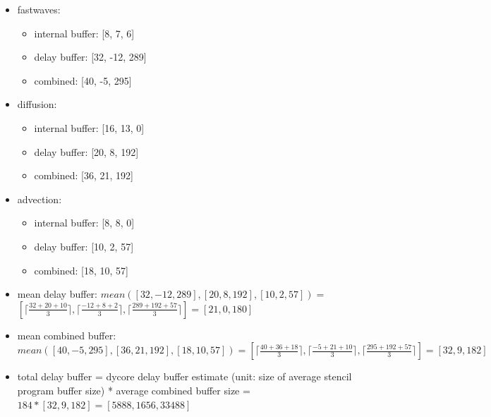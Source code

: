 \begin{itemize}
	\item fastwaves: 
	\begin{itemize}
		\item internal buffer: [8, 7, 6]
		\item delay buffer: [32, -12, 289]
		\item combined: [40, -5, 295]
	\end{itemize}
	\item diffusion: 
	\begin{itemize}
		\item internal buffer: [16, 13, 0]
		\item delay buffer: [20, 8, 192]
		\item combined: [36, 21, 192]
	\end{itemize}
	\item advection: 
	\begin{itemize}
		\item internal buffer: [8, 8, 0]
		\item delay buffer: [10, 2, 57]
		\item combined: [18, 10, 57]
	\end{itemize}
	\item mean delay buffer: $mean([32, -12, 289], [20, 8, 192], [10, 2, 57]) = $\\
	$ [\lceil\frac{32 + 20 + 10}{3}\rceil, \lceil\frac{-12 + 8 + 2}{3}\rceil, \lceil\frac{289 + 192 + 57}{3}\rceil] =	[21, 0, 180]$

	\item mean combined buffer: $mean([40, -5, 295], [36, 21, 192], [18, 10, 57]) = [\lceil\frac{40+36+18}{3}\rceil, \lceil\frac{-5 + 21 + 10}{3}\rceil, \lceil\frac{295 + 192 + 57}{3}\rceil] = [32, 9, 182]$
	
	\item total delay buffer = dycore delay buffer estimate (unit: size of average stencil program buffer size) * average combined buffer size = $184 * [32, 9, 182] = [5888, 1656, 33488]$
\end{itemize}


